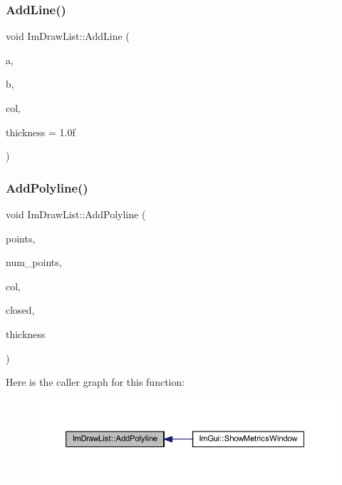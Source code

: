 \subsubsection{\texorpdfstring{Add\+Line()}{AddLine()}}
{\footnotesize\ttfamily void Im\+Draw\+List\+::\+Add\+Line (\begin{DoxyParamCaption}\item[{const \mbox{\hyperlink{struct_im_vec2}{Im\+Vec2}} \&}]{a,  }\item[{const \mbox{\hyperlink{struct_im_vec2}{Im\+Vec2}} \&}]{b,  }\item[{\mbox{\hyperlink{imgui_8h_a118cff4eeb8d00e7d07ce3d6460eed36}{Im\+U32}}}]{col,  }\item[{float}]{thickness = {\ttfamily 1.0f} }\end{DoxyParamCaption})}

\mbox{\label{struct_im_draw_list_aad1fcecdd4602fe6bb253fdee8ad5378}} 
\subsubsection{\texorpdfstring{Add\+Polyline()}{AddPolyline()}}
{\footnotesize\ttfamily void Im\+Draw\+List\+::\+Add\+Polyline (\begin{DoxyParamCaption}\item[{const \mbox{\hyperlink{struct_im_vec2}{Im\+Vec2}} $\ast$}]{points,  }\item[{const int}]{num\+\_\+points,  }\item[{\mbox{\hyperlink{imgui_8h_a118cff4eeb8d00e7d07ce3d6460eed36}{Im\+U32}}}]{col,  }\item[{bool}]{closed,  }\item[{float}]{thickness }\end{DoxyParamCaption})}

Here is the caller graph for this function\+:
\nopagebreak
\begin{figure}[H]
\begin{center}
\leavevmode
\includegraphics[width=350pt]{struct_im_draw_list_aad1fcecdd4602fe6bb253fdee8ad5378_icgraph}
\end{center}
\end{figure}
\mbox{\label{struct_im_draw_list_ac3fd62862000b2a7a4e7f61da0a4e3fd}} 
